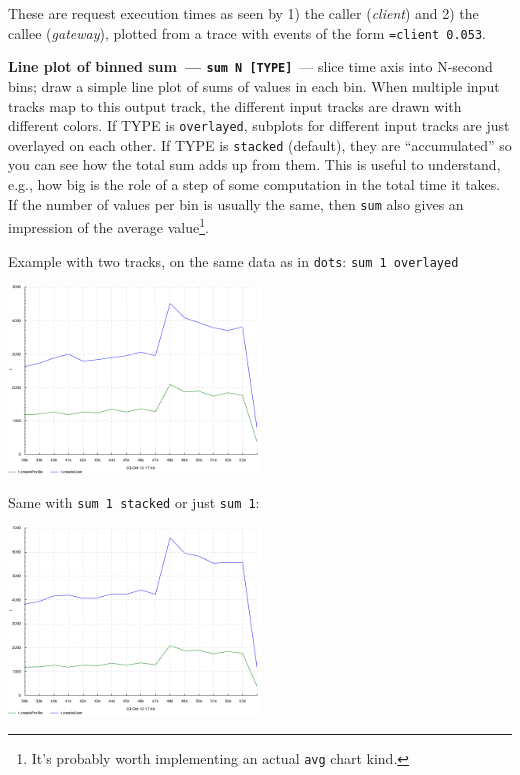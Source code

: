 \documentclass{article}
\begin{document}
These are request execution times as seen by 1) the caller (\emph{client}) and 2) the callee (\emph{gateway}), plotted from a trace with events of the form \texttt{=client 0.053}.

\pagebreak
\noindent
\textbf{Line plot of binned sum~--- \texttt{sum N [TYPE]}}~--- slice time axis into N-second bins; draw a simple line plot of sums of values in each bin. When multiple input tracks map to this output track, the different input tracks are drawn with different colors. If TYPE is \texttt{overlayed}, subplots for different input tracks are just overlayed on each other. If TYPE is \texttt{stacked} (default), they are ``accumulated'' so you can see how the total sum adds up from them. This is useful to understand, e.g., how big is the role of a step of some computation in the total time it takes. If the number of values per bin is usually the same, then \texttt{sum} also gives an impression of the average value\footnote{It's probably worth implementing an actual \texttt{avg} chart kind.}.

Example with two tracks, on the same data as in \texttt{dots}: \texttt{sum 1 overlayed}

{\centering \includegraphics[width=0.5\textwidth]{pics/tplot/sum-create-user-and-profile-overlayed.png}}

Same with \texttt{sum 1 stacked} or just \texttt{sum 1}:

{\centering \includegraphics[width=0.5\textwidth]{pics/tplot/sum-create-user-and-profile-stacked.png}}
\end{document}
